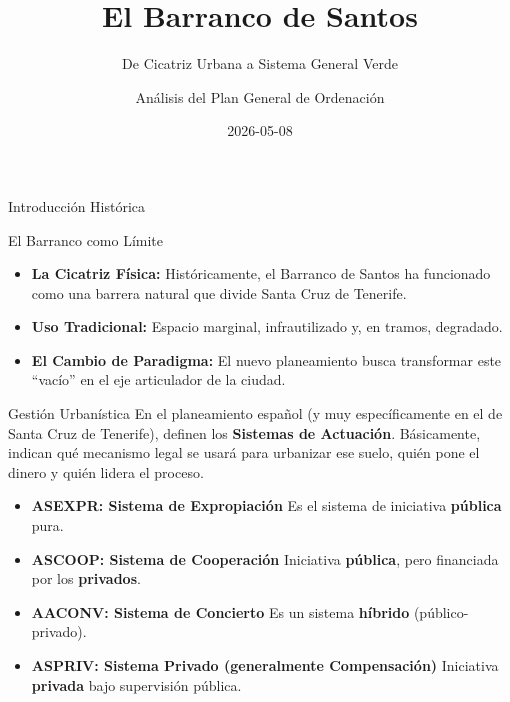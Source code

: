 \documentclass[
  ignorenonframetext,
  aspectratio=169,
  spanish,
]{beamer}
\title{\texorpdfstring{El Barranco de Santos}{El Barranco de Santos}}
\subtitle{\texorpdfstring{De Cicatriz Urbana a Sistema General
Verde}{De Cicatriz Urbana a Sistema General Verde}}
\author{Análisis del Plan General de Ordenación}
\date{2026-05-08}
\providecommand{\tightlist}{%
  \setlength{\itemsep}{0pt}\setlength{\parskip}{0pt}}
\begin{document}
\frame{\titlepage}


\begin{frame}{Introducción Histórica}
\protect{}\label{introducciuxf3n-histuxf3rica}
\begin{block}{El Barranco como Límite}
\protect{}\label{el-barranco-como-luxedmite}
\begin{itemize}
\tightlist
\item
  \textbf{La Cicatriz Física:} Históricamente, el Barranco de Santos ha
  funcionado como una barrera natural que divide Santa Cruz de Tenerife.
\item
  \textbf{Uso Tradicional:} Espacio marginal, infrautilizado y, en
  tramos, degradado.
\item
  \textbf{El Cambio de Paradigma:} El nuevo planeamiento busca
  transformar este ``vacío'' en el eje articulador de la ciudad.
\end{itemize}
\end{block}
\end{frame}

\begin{frame}{Gestión Urbanística}
\protect{}\label{gestiuxf3n-urbanuxedstica}
En el planeamiento español (y muy específicamente en el de Santa Cruz de
Tenerife), definen los \textbf{Sistemas de Actuación}. Básicamente,
indican qué mecanismo legal se usará para urbanizar ese suelo, quién
pone el dinero y quién lidera el proceso.

\begin{itemize}
\item
  \textbf{ASEXPR: Sistema de Expropiación} Es el sistema de iniciativa
  \textbf{pública} pura.
\item
  \textbf{ASCOOP: Sistema de Cooperación} Iniciativa \textbf{pública},
  pero financiada por los \textbf{privados}.
\end{itemize}

\begin{itemize}
\tightlist
\item
  \textbf{AACONV: Sistema de Concierto} Es un sistema \textbf{híbrido}
  (público-privado).
\end{itemize}

\begin{itemize}
\tightlist
\item
  \textbf{ASPRIV: Sistema Privado (generalmente Compensación)}
  Iniciativa \textbf{privada} bajo supervisión pública.
\end{itemize}
\end{frame}
\end{document}

